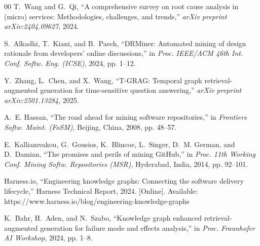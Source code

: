 \documentclass[conference]{IEEEtran}
\begin{document}
\begin{thebibliography}{00}
T.~Wang and G.~Qi, ``A comprehensive survey on root cause analysis in (micro) services: Methodologies, challenges, and trends,'' \emph{arXiv preprint arXiv:2404.09627}, 2024.

S.~Alkadhi, T.~Kiani, and B.~Paech, ``DRMiner: Automated mining of design rationale from developers' online discussions,'' in \emph{Proc. IEEE/ACM 46th Int. Conf. Softw. Eng. (ICSE)}, 2024, pp. 1--12.

Y.~Zhang, L.~Chen, and X.~Wang, ``T-GRAG: Temporal graph retrieval-augmented generation for time-sensitive question answering,'' \emph{arXiv preprint arXiv:2501.13284}, 2025.

A.~E. Hassan, ``The road ahead for mining software repositories,'' in \emph{Frontiers Softw. Maint. (FoSM)}, Beijing, China, 2008, pp. 48--57.

E.~Kalliamvakou, G.~Gousios, K.~Blincoe, L.~Singer, D.~M. German, and D.~Damian, ``The promises and perils of mining GitHub,'' in \emph{Proc. 11th Working Conf. Mining Softw. Repositories (MSR)}, Hyderabad, India, 2014, pp. 92--101.

Harness.io, ``Engineering knowledge graphs: Connecting the software delivery lifecycle,'' Harness Technical Report, 2024. [Online]. Available: https://www.harness.io/blog/engineering-knowledge-graphs

K.~Bahr, H.~Aden, and N.~Szabo, ``Knowledge graph enhanced retrieval-augmented generation for failure mode and effects analysis,'' in \emph{Proc. Fraunhofer AI Workshop}, 2024, pp. 1--8.

\end{thebibliography}
\end{document}
